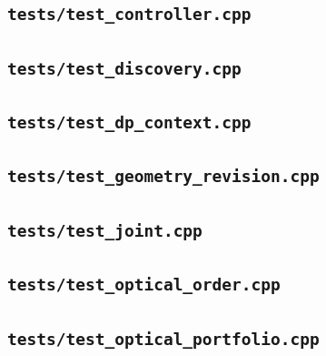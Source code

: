 \subsection*{\texttt{tests/test\_controller.cpp}}

\subsection*{\texttt{tests/test\_discovery.cpp}}

\subsection*{\texttt{tests/test\_dp\_context.cpp}}

\subsection*{\texttt{tests/test\_geometry\_revision.cpp}}

\subsection*{\texttt{tests/test\_joint.cpp}}

\subsection*{\texttt{tests/test\_optical\_order.cpp}}

\subsection*{\texttt{tests/test\_optical\_portfolio.cpp}}

